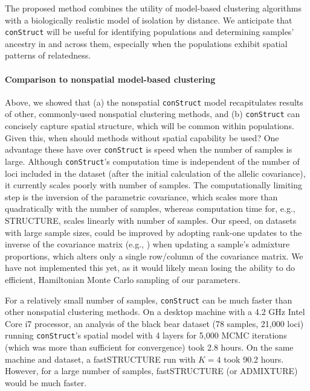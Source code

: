 \documentclass[10pt,letterpaper]{article}
\begin{document}
The proposed method combines the utility of model-based clustering algorithms 
with a biologically realistic model of isolation by distance.
We anticipate that \texttt{conStruct} will be useful for identifying populations 
and determining samples' ancestry in and across them, 
especially when the populations exhibit spatial patterns of relatedness.

\paragraph{Comparison to nonspatial model-based clustering}
Above, we showed that 
(a) the nonspatial \texttt{conStruct} model recapitulates results of 
other, commonly-used nonspatial clustering methods,
and 
(b) \texttt{conStruct} can concisely capture spatial structure, which
will be common within populations.
Given this, when should methods without spatial capability be used?
One advantage these have over \texttt{conStruct} is speed when the number of samples is large.
Although \texttt{conStruct}'s computation time is independent
of the number of loci included in the dataset 
(after the initial calculation of the allelic covariance), 
it currently scales poorly with number of samples.
The computationally limiting step is the inversion of the parametric covariance, 
which scales more than quadratically with the number of samples,
whereas computation time for, e.g., STRUCTURE, 
scales linearly with number of samples.
Our speed, on datasets with large sample sizes, 
could be improved by adopting rank-one updates 
to the inverse of the covariance matrix 
(e.g., \cite{woodbury1950,sherman_morrison1950})
when updating a sample's admixture proportions, 
which alters only a single row/column of the covariance matrix. 
We have not implemented this yet, 
as it would likely mean losing the ability to do efficient,  
Hamiltonian Monte Carlo sampling of our parameters.

For a relatively small number of samples, 
\texttt{conStruct} can be much faster than other nonspatial clustering methods.
On a desktop machine with a 4.2 GHz Intel Core i7 processor, 
an analysis of the black bear dataset (78 samples, 21,000 loci) 
running \texttt{conStruct}'s spatial model with 4 layers for 5,000 MCMC iterations 
(which was more than sufficient for convergence) 
took 2.8 hours.
On the same machine and dataset, 
a fastSTRUCTURE run with $K=4$ took 90.2 hours.
However, for a large number of samples, 
fastSTRUCTURE (or ADMIXTURE) would be much faster.
\end{document}
